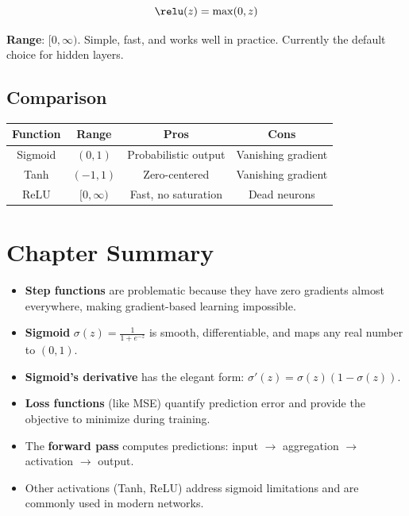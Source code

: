\[
\relu(z) = \max(0, z)
\]

\textbf{Range}: $[0, \infty)$. Simple, fast, and works well in practice. Currently the default choice for hidden layers.

\subsection{Comparison}

\begin{center}
\begin{tabular}{|c|c|c|c|}
\hline
\textbf{Function} & \textbf{Range} & \textbf{Pros} & \textbf{Cons} \\ \hline
Sigmoid & $(0,1)$ & Probabilistic output & Vanishing gradient \\ \hline
Tanh & $(-1,1)$ & Zero-centered & Vanishing gradient \\ \hline
ReLU & $[0,\infty)$ & Fast, no saturation & Dead neurons \\ \hline
\end{tabular}
\end{center}


\section{Chapter Summary}

\begin{itemize}
    \item \textbf{Step functions} are problematic because they have zero gradients almost everywhere, making gradient-based learning impossible.
    
    \item \textbf{Sigmoid} $\sigma(z) = \frac{1}{1+e^{-z}}$ is smooth, differentiable, and maps any real number to $(0,1)$.
    
    \item \textbf{Sigmoid's derivative} has the elegant form: $\sigma'(z) = \sigma(z)(1-\sigma(z))$.
    
    \item \textbf{Loss functions} (like MSE) quantify prediction error and provide the objective to minimize during training.
    
    \item The \textbf{forward pass} computes predictions: input $\rightarrow$ aggregation $\rightarrow$ activation $\rightarrow$ output.
    
    \item Other activations (Tanh, ReLU) address sigmoid limitations and are commonly used in modern networks.
\end{itemize}
